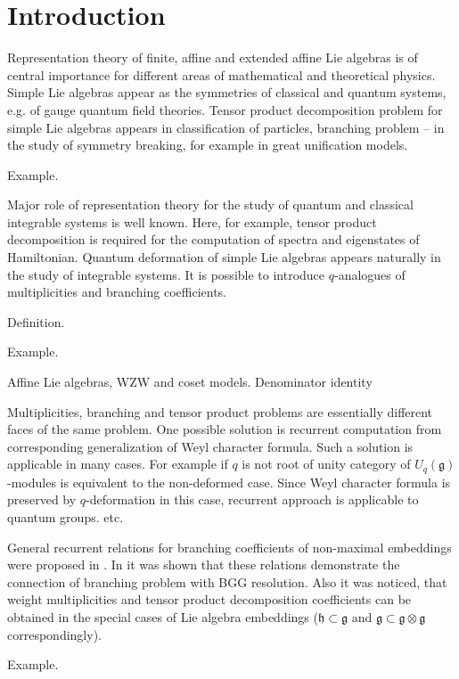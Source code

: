\documentclass[12pt]{article}
\theoremstyle{definition}
\newcommand{\gf}{\mathfrak{g}}
\newcommand{\hf}{\mathfrak{h}}
\begin{document}
\section{Introduction}

Representation theory of finite, affine and extended affine Lie algebras is of central importance for different areas of mathematical and theoretical physics. Simple Lie algebras appear as the symmetries of classical and quantum systems, e.g. of gauge quantum field theories. Tensor product decomposition problem for simple Lie algebras appears in classification of particles, branching problem -- in the study of symmetry breaking, for example in great unification models. 

Example.

Major role of representation theory for the study of quantum and classical integrable systems is well known. Here, for example, tensor product decomposition is required for the computation of spectra and eigenstates of Hamiltonian. Quantum deformation of simple Lie algebras appears naturally in the study of integrable systems. It is possible to introduce $q$-analogues of multiplicities and branching coefficients. 

Definition.

Example.

Affine Lie algebras, WZW and coset models. Denominator identity 



Multiplicities, branching and tensor product problems are essentially different faces of the same problem. One possible solution is recurrent computation from corresponding generalization of Weyl character formula. Such a solution is applicable in many cases. For example if $q$ is not root of unity category of $U_{q}(\gf)$-modules is equivalent to the non-deformed case.  Since Weyl character formula is preserved by $q$-deformation in this case, recurrent approach is applicable to quantum groups. etc.

General recurrent relations for branching coefficients of non-maximal embeddings were proposed in \cite{2010arXiv1007.0318L}. In \cite{2011arXiv1102.1702L} it was shown that these relations demonstrate the connection of branching problem with BGG resolution. Also it was noticed, that weight multiplicities and tensor product decomposition coefficients can be obtained in the special cases of Lie algebra embeddings ($\hf\subset\gf$ and $\gf\subset\gf\otimes\gf$ correspondingly).

Example.
\end{document}
